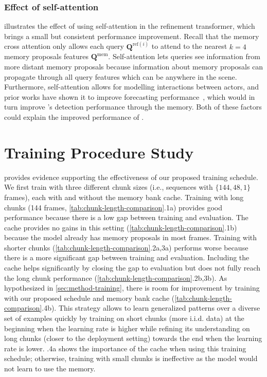 



\subsubsection{Effect of self-attention}

 illustrates the effect of using self-attention in the refinement transformer,
which brings a small but consistent performance improvement.
Recall that the memory cross attention only allows each query $\mathbf{Q}^{\mathrm{ref}(i)}$ to attend to
the nearest $k = 4$ memory proposals features $\mathbf{Q}^\mathrm{mem}$.
Self-attention lets queries see information from more distant memory proposals
because information about memory proposals can propagate through all query features which can be anywhere in the scene.
Furthermore, self-attention allows for modelling interactions between actors,
and prior works have shown it to improve forecasting performance~\cite{casas2024detra},
which would in turn improve \ourmodel{}'s detection performance through the memory.
Both of these factors could explain the improved performance of \ourmodel{}.



\section{Training Procedure Study}

 provides evidence supporting the effectiveness of our proposed training schedule.
We first train \ourmodel{} with three different chunk sizes
(i.e., sequences with $\{144, 48, 1\}$ frames), each with and without
the memory bank cache.
Training with long chunks (144 frames, \cref{tab:chunk-length-comparison}.1a) provides good performance
because there is a low gap between training and evaluation.
The cache provides no gains in this setting (\cref{tab:chunk-length-comparison}.1b) because the model already has memory proposals in most frames.
Training with shorter chunks (\cref{tab:chunk-length-comparison}.2a,3a) performs worse because there is a more significant gap between training and evaluation.
Including the cache helps significantly by closing the gap to evaluation but does not fully reach the long chunk performance (\cref{tab:chunk-length-comparison}.2b,3b).
As hypothesized in \cref{sec:method-training}, there is room for improvement by training with our proposed schedule and memory bank cache (\cref{tab:chunk-length-comparison}.4b). This strategy allows \ourmodel{} to learn generalized patterns over a diverse set of examples quickly by training on short chunks (more i.i.d. data) at the beginning when the learning rate is higher while refining its understanding on long chunks (closer to the deployment setting) towards the end when the learning rate is lower.
.4a shows the importance of the cache when using this training schedule; otherwise, training with small chunks is ineffective as the model would not learn to use the memory.

